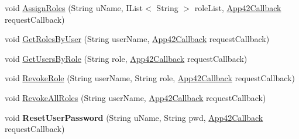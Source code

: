 \begin{DoxyCompactItemize}
\item 
void \hyperlink{classcom_1_1shephertz_1_1app42_1_1paas_1_1sdk_1_1windows_1_1user_1_1_user_service_ac4a492f0d6869990b8e28d0793c78098}{Assign\+Roles} (String u\+Name, I\+List$<$ String $>$ role\+List, \hyperlink{interfacecom_1_1shephertz_1_1app42_1_1paas_1_1sdk_1_1windows_1_1_app42_callback}{App42\+Callback} request\+Callback)
\item 
void \hyperlink{classcom_1_1shephertz_1_1app42_1_1paas_1_1sdk_1_1windows_1_1user_1_1_user_service_ae31b6376a1d5f74e289d5835689413f9}{Get\+Roles\+By\+User} (String user\+Name, \hyperlink{interfacecom_1_1shephertz_1_1app42_1_1paas_1_1sdk_1_1windows_1_1_app42_callback}{App42\+Callback} request\+Callback)
\item 
void \hyperlink{classcom_1_1shephertz_1_1app42_1_1paas_1_1sdk_1_1windows_1_1user_1_1_user_service_a124c4bc8927a6e2dd3398e10ec2bb88b}{Get\+Users\+By\+Role} (String role, \hyperlink{interfacecom_1_1shephertz_1_1app42_1_1paas_1_1sdk_1_1windows_1_1_app42_callback}{App42\+Callback} request\+Callback)
\item 
void \hyperlink{classcom_1_1shephertz_1_1app42_1_1paas_1_1sdk_1_1windows_1_1user_1_1_user_service_a81f3442333a33c66a5c83b50b5cfbd08}{Revoke\+Role} (String user\+Name, String role, \hyperlink{interfacecom_1_1shephertz_1_1app42_1_1paas_1_1sdk_1_1windows_1_1_app42_callback}{App42\+Callback} request\+Callback)
\item 
void \hyperlink{classcom_1_1shephertz_1_1app42_1_1paas_1_1sdk_1_1windows_1_1user_1_1_user_service_ae9a1b4f70d7fc12d1a3bf7a0efaabc61}{Revoke\+All\+Roles} (String user\+Name, \hyperlink{interfacecom_1_1shephertz_1_1app42_1_1paas_1_1sdk_1_1windows_1_1_app42_callback}{App42\+Callback} request\+Callback)
\item 
\hypertarget{classcom_1_1shephertz_1_1app42_1_1paas_1_1sdk_1_1windows_1_1user_1_1_user_service_a064fdeed6dc0a40d15290f8850d3426d}{void {\bfseries Reset\+User\+Password} (String u\+Name, String pwd, \hyperlink{interfacecom_1_1shephertz_1_1app42_1_1paas_1_1sdk_1_1windows_1_1_app42_callback}{App42\+Callback} request\+Callback)}\label{classcom_1_1shephertz_1_1app42_1_1paas_1_1sdk_1_1windows_1_1user_1_1_user_service_a064fdeed6dc0a40d15290f8850d3426d}


\end{DoxyCompactItemize}
